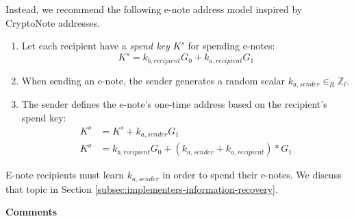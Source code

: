 Instead, we recommend the following e-note address model inspired by CryptoNote addresses.

\begin{enumerate}
    \item Let each recipient have a {\em spend key} $K^s$ for spending e-notes:\vspace{.115cm}
    \[K^s = k_{b, recipient} G_0 + k_{a, recipient} G_1\]

    \item When sending an e-note, the sender generates a random scalar $k_{a, sender} \in_R \mathbb{Z}_l$.

    \item The sender defines the e-note's one-time address based on the recipient's spend key:\vspace{.115cm}
    \begin{align*}
        K^o &= K^s + k_{a, sender} G_1 \\
        K^o &= k_{b, recipient} G_0 + (k_{a, sender} + k_{a, recipient})*G_1
    \end{align*}
\end{enumerate}

E-note recipients must learn $k_{a, sender}$ in order to spend their e-notes. We discuss that topic in Section \ref{subsec:implementers-information-recovery}.

\textbf{Comments}

